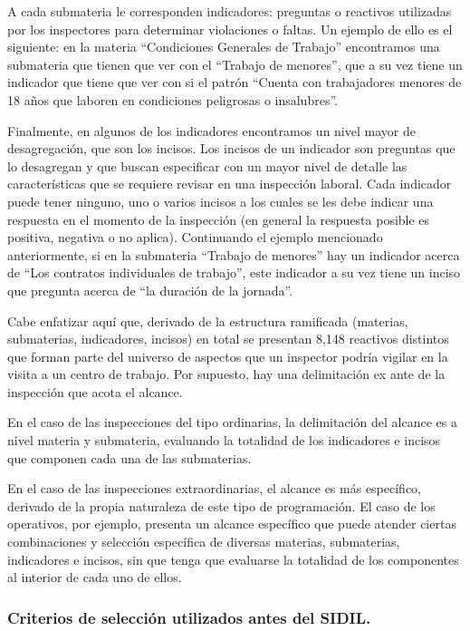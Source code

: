 \documentclass[
]{article}
\begin{document}
A cada submateria le corresponden indicadores: preguntas o reactivos utilizadas por los inspectores para determinar violaciones o faltas. Un ejemplo de ello es el siguiente: en la materia ``Condiciones Generales de Trabajo'' encontramos una submateria que tienen que ver con el ``Trabajo de menores'', que a su vez tiene un indicador que tiene que ver con si el patrón ``Cuenta con trabajadores menores de 18 años que laboren en condiciones peligrosas o insalubres''.

Finalmente, en algunos de los indicadores encontramos un nivel mayor de desagregación, que son los incisos. Los incisos de un indicador son preguntas que lo desagregan y que buscan especificar con un mayor nivel de detalle las características que se requiere revisar en una inspección laboral. Cada indicador puede tener ninguno, uno o varios incisos a los cuales se les debe indicar una respuesta en el momento de la inspección (en general la respuesta posible es positiva, negativa o no aplica). Continuando el ejemplo mencionado anteriormente, si en la submateria ``Trabajo de menores'' hay un indicador acerca de ``Los contratos individuales de trabajo'', este indicador a su vez tiene un inciso que pregunta acerca de ``la duración de la jornada''.

Cabe enfatizar aquí que, derivado de la estructura ramificada (materias, submaterias, indicadores, incisos) en total se presentan 8,148 reactivos distintos que forman parte del universo de aspectos que un inspector podría vigilar en la visita a un centro de trabajo. Por supuesto, hay una delimitación ex ante de la inspección que acota el alcance.

En el caso de las inspecciones del tipo ordinarias, la delimitación del alcance es a nivel materia y submateria, evaluando la totalidad de los indicadores e incisos que componen cada una de las submaterias.

En el caso de las inspecciones extraordinarias, el alcance es más específico, derivado de la propia naturaleza de este tipo de programación. El caso de los operativos, por ejemplo, presenta un alcance específico que puede atender ciertas combinaciones y selección específica de diversas materias, submaterias, indicadores e incisos, sin que tenga que evaluarse la totalidad de los componentes al interior de cada uno de ellos.

\hypertarget{criterios-de-selecciuxf3n-utilizados-antes-del-sidil.}{%
\subsubsection{Criterios de selección utilizados antes del SIDIL.}\label{criterios-de-selecciuxf3n-utilizados-antes-del-sidil.}}
\end{document}
